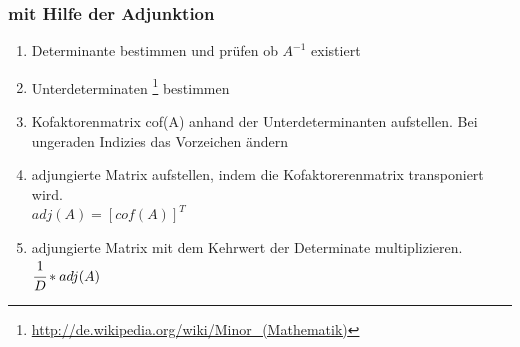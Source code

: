 \documentclass[a4paper,12pt]{scrartcl}
\begin{document}
\subsubsection{mit Hilfe der Adjunktion}
\begin{enumerate}
\item Determinante bestimmen und prüfen ob  $A^{-1}$ existiert
\item Unterdeterminaten \footnote{\url{http://de.wikipedia.org/wiki/Minor_(Mathematik)}} bestimmen
\item Kofaktorenmatrix cof(A) anhand der Unterdeterminanten aufstellen. Bei ungeraden Indizies das Vorzeichen ändern
\item adjungierte Matrix aufstellen, indem die Kofaktorerenmatrix transponiert wird. \\ $adj(A) = [cof(A)]^T$
\item adjungierte Matrix mit dem Kehrwert der Determinate multiplizieren. \\ $\cfrac{1}{D} * adj(A)$
\end{enumerate}
\end{document}
